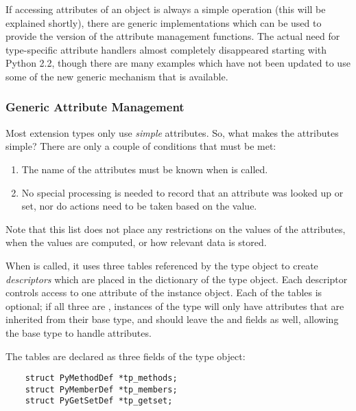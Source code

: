 If accessing attributes of an object is always a simple operation
(this will be explained shortly), there are generic implementations
which can be used to provide the  version of the
attribute management functions.  The actual need for type-specific
attribute handlers almost completely disappeared starting with Python
2.2, though there are many examples which have not been updated to use
some of the new generic mechanism that is available.


\subsubsection{Generic Attribute Management}


Most extension types only use \emph{simple} attributes.  So, what
makes the attributes simple?  There are only a couple of conditions
that must be met:

\begin{enumerate}
  \item   The name of the attributes must be known when
           is called.

  \item   No special processing is needed to record that an attribute
          was looked up or set, nor do actions need to be taken based
          on the value.
\end{enumerate}

Note that this list does not place any restrictions on the values of
the attributes, when the values are computed, or how relevant data is
stored.

When  is called, it uses three tables
referenced by the type object to create \emph{descriptors} which are
placed in the dictionary of the type object.  Each descriptor controls
access to one attribute of the instance object.  Each of the tables is
optional; if all three are \NULL, instances of the type will only have
attributes that are inherited from their base type, and should leave
the  and  fields \NULL{} as
well, allowing the base type to handle attributes.

The tables are declared as three fields of the type object:

\begin{verbatim}
    struct PyMethodDef *tp_methods;
    struct PyMemberDef *tp_members;
    struct PyGetSetDef *tp_getset;
\end{verbatim}

